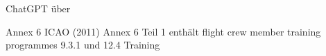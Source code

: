 

ChatGPT über 

Annex 6 ICAO (2011) Annex 6  Teil 1 enthält flight crew member training programmes 9.3.1 und 12.4 Training